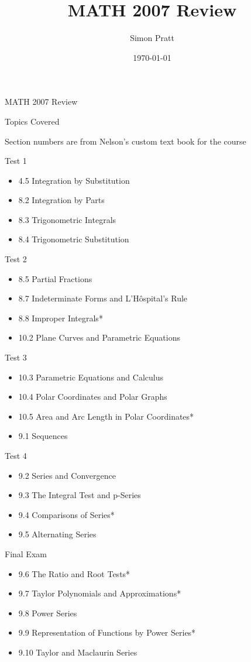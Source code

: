 \documentclass{article}
\title{MATH 2007 Review}
\author{Simon Pratt}
\date{\today}
\begin{document}
{\Huge MATH 2007 Review}

\vspace{1 cm}

{\huge Topics Covered}

{\tiny Section numbers are from Nelson's custom text book for the course}

Test 1
\begin{itemize}
\item 4.5 Integration by Substitution
\item 8.2 Integration by Parts
\item 8.3 Trigonometric Integrals
\item 8.4 Trigonometric Substitution
\end{itemize}

Test 2
\begin{itemize}
\item 8.5 Partial Fractions
\item 8.7 Indeterminate Forms and L'H\^{o}spital's Rule
\item 8.8 Improper Integrals*
\item 10.2 Plane Curves and Parametric Equations
\end{itemize}

Test 3
\begin{itemize}
\item 10.3 Parametric Equations and Calculus
\item 10.4 Polar Coordinates and Polar Graphs
\item 10.5 Area and Arc Length in Polar Coordinates*
\item 9.1 Sequences
\end{itemize}

Test 4
\begin{itemize}
\item 9.2 Series and Convergence
\item 9.3 The Integral Test and p-Series
\item 9.4 Comparisons of Series*
\item 9.5 Alternating Series
\end{itemize}

Final Exam
\begin{itemize}
\item 9.6 The Ratio and Root Tests*
\item 9.7 Taylor Polynomials and Approximations*
\item 9.8 Power Series
\item 9.9 Representation of Functions by Power Series*
\item 9.10 Taylor and Maclaurin Series
\end{itemize}
\end{document}
